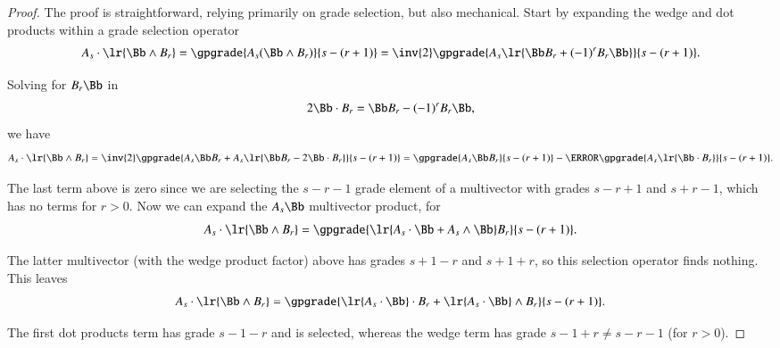 %
%
\begin{proof}
The proof is straightforward, relying primarily on grade selection, but also mechanical.
Start by expanding the wedge and dot products within a grade selection operator
\begin{dmath}\label{eqn:wedgeDistributionIdentityProblemsWedgeDistributionIdentityProof:1460}
A_s \cdot \lr{ \Bb \wedge B_r }
=
\gpgrade{A_s (\Bb \wedge B_r)}{s - (r + 1)}
=
\inv{2} \gpgrade{A_s \lr{\Bb B_r + (-1)^{r} B_r \Bb} }{s - (r + 1)}.
\end{dmath}

Solving for \(B_r \Bb\) in
\begin{dmath}\label{eqn:wedgeDistributionIdentityProblemsWedgeDistributionIdentityProof:1480}
2 \Bb \cdot B_r = \Bb B_r - (-1)^{r} B_r \Bb,
\end{dmath}
we have
\begin{dmath}\label{eqn:wedgeDistributionIdentityProblemsWedgeDistributionIdentityProof:1500}
A_s \cdot \lr{ \Bb \wedge B_r }
=
\inv{2} \gpgrade{ A_s \Bb B_r + A_s \lr{ \Bb B_r - 2 \Bb \cdot B_r } }{s - (r + 1)}
=
\gpgrade{ A_s \Bb B_r }{s - (r + 1)}
-
\cancel{\gpgrade{ A_s \lr{ \Bb \cdot B_r } }{s - (r + 1)}}.
\end{dmath}

The last term above is zero since we are selecting the \(s - r - 1\) grade element of a multivector with grades \(s - r + 1\) and \(s + r - 1\), which has no terms for \(r > 0\).
Now we can expand the \(A_s \Bb\) multivector product, for
\begin{dmath}\label{eqn:wedgeDistributionIdentityProblemsWedgeDistributionIdentityProof:1520}
A_s \cdot \lr{ \Bb \wedge B_r }
=
\gpgrade{ \lr{ A_s \cdot \Bb + A_s \wedge \Bb} B_r }{s - (r + 1)}.
\end{dmath}

The latter multivector (with the wedge product factor) above has grades \(s + 1 - r\) and \(s + 1 + r\), so this selection operator finds nothing.
This leaves
\begin{dmath}\label{eqn:wedgeDistributionIdentityProblemsWedgeDistributionIdentityProof:1540}
A_s \cdot \lr{ \Bb \wedge B_r }
=
\gpgrade{
\lr{ A_s \cdot \Bb } \cdot B_r
+ \lr{ A_s \cdot \Bb } \wedge B_r
}{s - (r + 1)}.
\end{dmath}

The first dot products term has grade \(s - 1 - r\) and is selected, whereas the wedge term has grade \(s - 1 + r \ne s - r - 1\) (for \(r > 0\)).
\end{proof}


